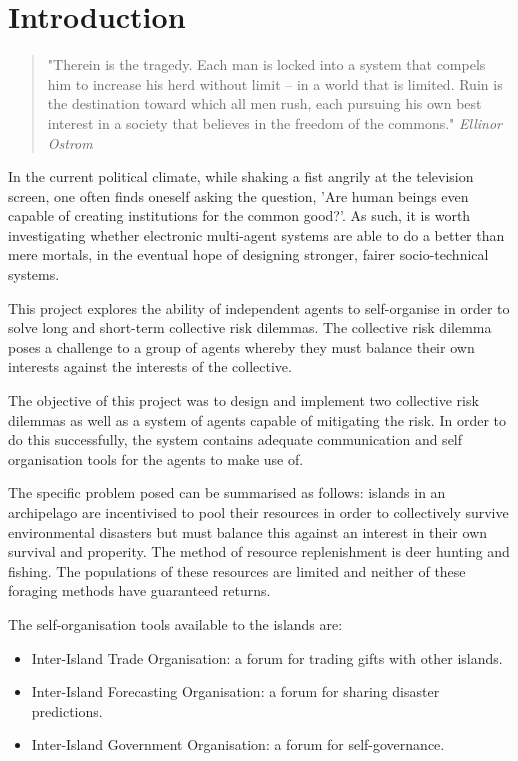 \chapter{Introduction}

\begin{flushleft}
\begin{quote}
    "Therein is the tragedy. Each man is locked into a system that compels him to increase his herd without limit – in a world that is limited. Ruin is the destination toward which all men rush, each pursuing his own best interest in a society that believes in the freedom of the commons."
    \linebreak
    \emph{Ellinor Ostrom}
\end{quote}
\end{flushleft}

In the current political climate, while shaking a fist angrily at the television screen, one often finds oneself asking the question, 'Are human beings even capable of creating institutions for the common good?'. As such, it is worth investigating whether electronic multi-agent systems are able to do a better than mere mortals, in the eventual hope of designing stronger, fairer socio-technical systems.

This project explores the ability of independent agents to self-organise in order to solve long and short-term collective risk dilemmas. The collective risk dilemma poses a challenge to a group of agents whereby they must balance their own interests against the interests of the collective. 

The objective of this project was to design and implement two collective risk dilemmas as well as a system of agents capable of mitigating the risk. In order to do this successfully, the system contains adequate communication and self organisation tools for the agents to make use of.

The specific problem posed can be summarised as follows: islands in an archipelago are incentivised to pool their resources in order to collectively survive environmental disasters but must balance this against an interest in their own survival and properity. The method of resource replenishment is deer hunting and fishing. The populations of these resources are limited and neither of these foraging methods have guaranteed returns. 

The self-organisation tools available to the islands are:

\begin{itemize}
    \item Inter-Island Trade Organisation: a forum for trading gifts with other islands.
    \item Inter-Island Forecasting Organisation: a forum for sharing disaster predictions.
    \item Inter-Island Government Organisation: a forum for self-governance.
\end{itemize}
